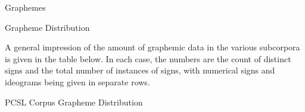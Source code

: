 	\centerline{\vbox{\offinterlineskip{}
}}\Hh{}Graphemes

\Hhhh{}Grapheme Distribution


\par A general impression of the amount of graphemic data in the
      various subcorpora is given in the table below.  In each case,
      the numbers are the count of distinct signs and the total number
      of instances of signs, with numerical signs and ideograms being
      given in separate rows.

\Hhhhh{}PCSL Corpus Grapheme Distribution

\bigskip

